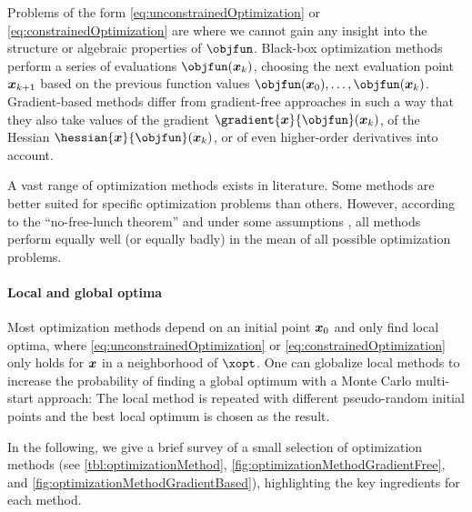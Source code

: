 Problems of the form \eqref{eq:unconstrainedOptimization} or
\eqref{eq:constrainedOptimization} are 
where we cannot gain any insight into the structure or algebraic
properties of $\objfun$.
Black-box optimization methods perform a series of evaluations
$\objfun(\*x_k)$,
choosing the next evaluation point ${\boldsymbol{x}}_{k+1}$
based on the previous function values $\objfun(\*x_0), \dotsc, \objfun(\*x_k)$.
Gradient-based methods differ from gradient-free approaches
in such a way that they also take values
of the gradient $\gradient{\*x}{\objfun}(\*x_k)$,
of the Hessian $\hessian{\*x}{\objfun}(\*x_k)$, or
of even higher-order derivatives into account.

A vast range of optimization methods exists in literature.
Some methods are better suited for specific optimization problems
than others.
However, according to the ``no-free-lunch theorem''
and under some assumptions \cite{Wolpert97No},
all methods perform equally well (or equally badly) in the mean of all possible
optimization problems.

\paragraph{Local and global optima}

Most optimization methods depend on an initial point ${\boldsymbol{x}}_0$ and
only find local optima,
where \eqref{eq:unconstrainedOptimization} or
\eqref{eq:constrainedOptimization} only holds for ${\boldsymbol{x}}$
in a neighborhood of $\xopt$.
One can globalize local methods to increase the probability
of finding a global optimum with a Monte Carlo multi-start approach:
The local method is repeated with different pseudo-random initial points
and the best local optimum is chosen as the result.

In the following,
we give a brief survey of a small selection of optimization methods
(see
\cref{tbl:optimizationMethod},
\cref{fig:optimizationMethodGradientFree}, and
\cref{fig:optimizationMethodGradientBased}),
highlighting the key ingredients for each method.

